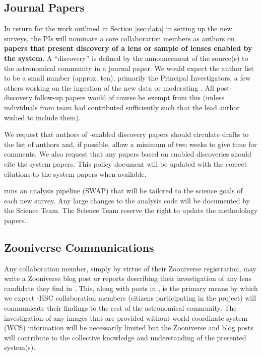 \documentclass[a4paper,twocolumn]{article}
\begin{document}
\subsection{Journal Papers}
\label{sec:papers}
In return for the work outlined in Section \ref{sec:data} in setting up the new surveys, the \SW PIs will nominate a core \SW collaboration members as authors on \textbf{papers that
present discovery of a lens or sample of lenses enabled by the \SW system}. A ``discovery'' is defined by the announcement of the source(s) to the astronomical community in a journal paper. We would expect the \SW author list to be a small number (approx. ten), primarily the Principal Investigators, a few others working on the ingestion of the new data or moderating \Talk. All post-discovery follow-up papers would of course be exempt from this (unless individuals from \sw team had contributed sufficiently such that the lead author wished to include them). 

We request that authors of \SW-enabled discovery papers should circulate drafts to the list of \SW authors and, if possible, allow a minimum of two weeks to give time for comments. We also request that any papers based on \SW enabled discoveries should cite the \SW system papers. This policy document will be updated with the correct citations to the \SW system papers when available.

\SW runs an analysis pipeline (SWAP) that will be tailored to the science goals of each new survey. Any large changes to the analysis code will be documented  by the \SW Science Team. The \SW Science Team reserve the right to update the \SW methodology papers.



\subsection{Zooniverse Communications}
\label{sec:comm}

Any \SW collaboration member, simply by virtue of their Zooniverse
registration, may write a Zooniverse
blog post or \Talk reports describing their
investigation of any lens candidate they find in \SW. This, along with
posts in  \Talk, is the primary means by which we expect \SW-HSC collaboration
members (citizens participating in the project) will communicate their findings to the rest of the
astronomical community. The investigation of any \SW images that are
provided without world coordinate system (WCS) information will be
necessarily limited but the \SW Zooniverse \Talk and blog posts will contribute to the collective knowledge and understanding of the presented system(s).
\end{document}
